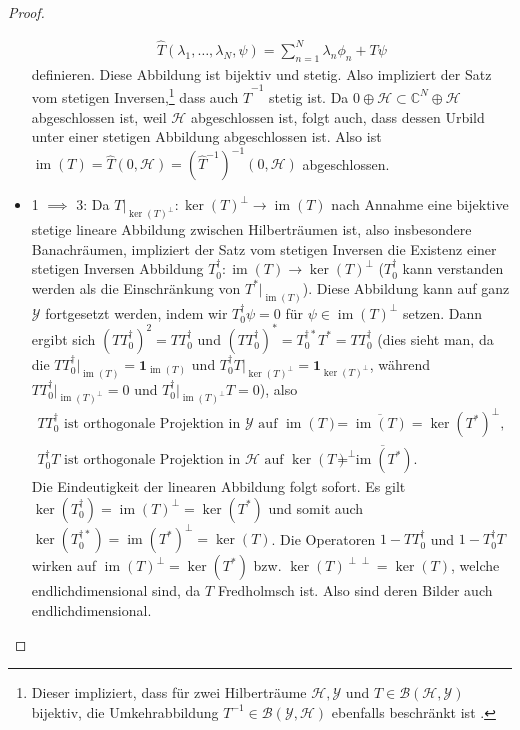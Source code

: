 \documentclass[11pt, hidelinks]{article}
\newcommand{\h}{\mathcal{H}}
\newcommand{\im}{\operatorname{im}}
\numberwithin{conj}{section}
\begin{document}
\begin{proof}
\begin{itemize}
    \begin{align}
        \hat{T}(\lambda_1, \ldots, \lambda_N, \psi) = \sum_{n=1}^{N} \lambda_n \phi_n + T\psi
    \end{align}
    definieren. Diese Abbildung ist bijektiv und stetig. Also impliziert der Satz vom stetigen Inversen,\footnote{Dieser impliziert, dass für zwei Hilberträume $\h,\mathcal{Y}$ und $T \in \mathcal{B}(\h,\mathcal{Y})$ bijektiv, die Umkehrabbildung $T^{-1} \in \mathcal{B}(\mathcal{Y},\h)$ ebenfalls beschränkt ist \cite[Korollar 3.24]{lechner}.} dass auch $\hat{T}^{-1}$ stetig ist. Da $0 \oplus \h \subset \mathbb{C}^N \oplus \h$ abgeschlossen ist, weil $\h$ abgeschlossen ist, folgt auch, dass dessen Urbild unter einer stetigen Abbildung abgeschlossen ist. Also ist $\im(T) = \hat{T}(0,\h) = (\hat{T}^{-1})^{-1}(0,\h)$ abgeschlossen.
    \item 1 $\implies$ 3: Da $T\vert_{\ker(T)^\perp}: \ker(T)^\perp \to \im(T)$ nach Annahme eine bijektive stetige lineare Abbildung zwischen Hilberträumen ist, also insbesondere Banachräumen, impliziert der Satz vom stetigen Inversen \cite[Korollar 3.24]{lechner} die Existenz einer stetigen Inversen Abbildung $T^\dagger_0: \im(T) \to \ker(T)^\perp$ ($T^\dagger_0$ kann verstanden werden als die Einschränkung von $T^\ast\vert_{\im(T)}$). Diese Abbildung kann auf ganz $\mathcal{Y}$ fortgesetzt werden, indem wir $T^\dagger_0 \psi = 0$ für $\psi \in \im(T)^\perp$ setzen. Dann ergibt sich $(TT^\dagger_0)^2 = TT^\dagger_0$ und $(TT^\dagger_0)^\ast = T^{\dagger\ast}_0 T^\ast =  TT^\dagger_0$ (dies sieht man, da die $TT^\dagger_0\vert_{\im(T)} = \mathbf{1}_{\im(T)}$ und $T^\dagger_0T\vert_{\ker(T)^\perp} = \mathbf{1}_{\ker(T)^\perp}$, während $TT^\dagger_0\vert_{\im(T)^\perp} = 0$ und $T^\dagger_0\vert_{\im(T)^\perp}T = 0$), also
    \begin{align*}
        TT^\dagger_0  \text{ ist orthogonale Projektion in $\mathcal{Y}$ auf } \im(T) &= \overline{\im(T)} = \ker(T^\ast)^\perp, \\
        T^\dagger_0 T \text{ ist orthogonale Projektion in $\h$ auf } \ker(T)^\perp &= \overline{\im(T^\ast)}.
    \end{align*}
    Die Eindeutigkeit der linearen Abbildung folgt sofort. Es gilt $\ker(T_0^\dagger) = \im(T)^\perp = \ker(T^\ast)$ und somit auch $\ker(T_0^{\dagger\ast}) = \im(T^\ast)^\perp = \ker(T)$. Die Operatoren $1-TT^\dagger_0$ und $1-T^\dagger_0 T$ wirken auf $\im(T)^\perp = \ker(T^\ast)$ bzw. $\ker(T)^{\perp\perp} = \ker(T)$, welche endlichdimensional sind, da $T$ Fredholmsch ist. Also sind deren Bilder auch endlichdimensional.

\end{itemize}
\end{proof}
\end{document}
